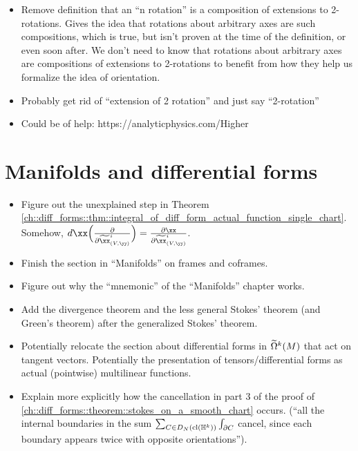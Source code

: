 \begin{itemize}
    \item Remove definition that an “n rotation” is a composition of extensions to 2-rotations. Gives the idea that rotations about arbitrary axes are such compositions, which is true, but isn’t proven at the time of the definition, or even soon after. We don’t need to know that rotations about arbitrary axes are compositions of extensions to 2-rotations to benefit from how they help us formalize the idea of orientation.
    \item Probably get rid of “extension of 2 rotation” and just say “2-rotation”
    \item Could be of help: https://analyticphysics.com/Higher%
\end{itemize}

\section*{Manifolds and differential forms}

\begin{itemize}
    
    \item Figure out the unexplained step in Theorem \ref{ch::diff_forms::thm::integral_of_diff_form_actual_function_single_chart}. Somehow, $d\xx \Big( \frac{\pd}{\pd \tx^i_{(V, \yy)}} \Big) = \frac{\pd \xx}{\pd \tx^i_{(V, \yy)}}$. 
    \item Finish the section in ``Manifolds'' on frames and coframes.
    \item Figure out why the ``mnemonic'' of the ``Manifolds'' chapter works.
    \item Add the divergence theorem and the less general Stokes' theorem (and Green's theorem) after the generalized Stokes' theorem.
    \item Potentially relocate the section about differential forms in $\widetilde{\Omega}^k(M)$ that act on tangent vectors. Potentially the presentation of  tensors/differential forms as actual (pointwise) multilinear functions.
    \item Explain more explicitly how the cancellation in part 3 of the proof of \ref{ch::diff_forms::theorem::stokes_on_a_smooth_chart} occurs. (``all the internal boundaries in the sum $\sum_{C \in D_N(\text{cl}(\mathbb{H}^k))} \int_{\partial C}$ cancel, since each boundary appears twice with opposite orientations'').
\end{itemize}
